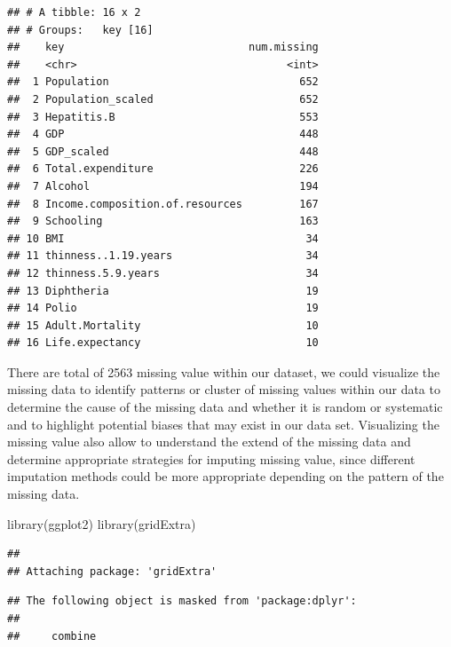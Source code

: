 \documentclass[
]{article}
\newenvironment{Shaded}{\begin{snugshade}}{\end{snugshade}}
\newcommand{\FunctionTok}[1]{\textcolor[rgb]{0.00,0.00,0.00}{#1}}
\newcommand{\NormalTok}[1]{#1}
\begin{document}
\begin{verbatim}
## # A tibble: 16 x 2
## # Groups:   key [16]
##    key                             num.missing
##    <chr>                                 <int>
##  1 Population                              652
##  2 Population_scaled                       652
##  3 Hepatitis.B                             553
##  4 GDP                                     448
##  5 GDP_scaled                              448
##  6 Total.expenditure                       226
##  7 Alcohol                                 194
##  8 Income.composition.of.resources         167
##  9 Schooling                               163
## 10 BMI                                      34
## 11 thinness..1.19.years                     34
## 12 thinness.5.9.years                       34
## 13 Diphtheria                               19
## 14 Polio                                    19
## 15 Adult.Mortality                          10
## 16 Life.expectancy                          10
\end{verbatim}

There are total of 2563 missing value within our dataset, we could
visualize the missing data to identify patterns or cluster of missing
values within our data to determine the cause of the missing data and
whether it is random or systematic and to highlight potential biases
that may exist in our data set. Visualizing the missing value also allow
to understand the extend of the missing data and determine appropriate
strategies for imputing missing value, since different imputation
methods could be more appropriate depending on the pattern of the
missing data.

\begin{Shaded}
\begin{Highlighting}[]
\FunctionTok{library}\NormalTok{(ggplot2)}
\FunctionTok{library}\NormalTok{(gridExtra)}
\end{Highlighting}
\end{Shaded}

\begin{verbatim}
## 
## Attaching package: 'gridExtra'
\end{verbatim}

\begin{verbatim}
## The following object is masked from 'package:dplyr':
## 
##     combine
\end{verbatim}
\end{document}
